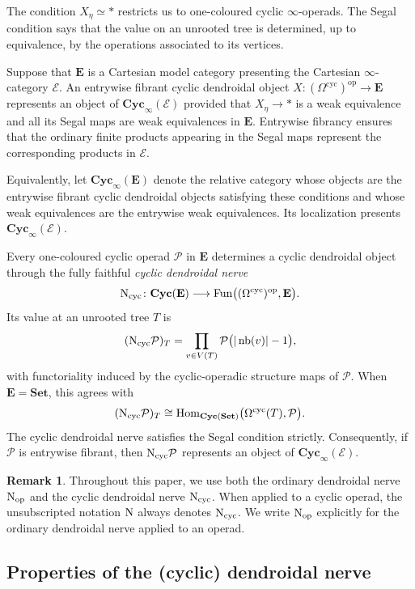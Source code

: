 \documentclass{amsart}
\newcommand{\bE}{\mathbf{E}}
\newcommand{\Set}{\mathbf{Set}}
\newcommand{\Cyc}{\mathbf{Cyc}}
\newcommand{\Hom}{\operatorname{Hom}}
\newcommand{\nerve}{\textnormal{N}}
\theoremstyle{definition}
\newtheorem{remark}[theorem]{Remark}%
\numberwithin{equation}{section}
\begin{document}
The condition $X_\eta\simeq *$ restricts us to one-coloured cyclic
$\infty$-operads. The Segal condition says that the value on an
unrooted tree is determined, up to equivalence, by the operations
associated to its vertices.

Suppose that $\bE$ is a Cartesian model category presenting the
Cartesian $\infty$-category $\mathcal E$. An entrywise fibrant cyclic
dendroidal object
$X\colon(\Omega^{\mathrm{cyc}})^{\mathrm{op}}\to\bE$
represents an object of $\Cyc_\infty(\mathcal E)$ provided that
$X_\eta\to *$ is a weak equivalence and all its Segal maps are weak
equivalences in $\bE$. Entrywise fibrancy ensures that the ordinary finite products
appearing in the Segal maps represent the corresponding products in
$\mathcal E$.

Equivalently, let $\Cyc_\infty(\bE)$ denote the relative category
whose objects are the entrywise fibrant cyclic dendroidal objects
satisfying these conditions and whose weak equivalences are the
entrywise weak equivalences. Its localization presents
$\Cyc_\infty(\mathcal E)$.

Every one-coloured cyclic operad $\mathcal P$ in $\bE$ determines a
cyclic dendroidal object through the fully faithful
\emph{cyclic dendroidal nerve}
\[
\nerve_{\mathrm{cyc}}\colon
\Cyc(\bE)
\longrightarrow
\operatorname{Fun}
\bigl((\Omega^{\mathrm{cyc}})^{\mathrm{op}},\bE\bigr).
\]
Its value at an unrooted tree $T$ is
\[
(\nerve_{\mathrm{cyc}}\mathcal P)_T
=
\prod_{v\in V(T)}
\mathcal P\bigl(|\operatorname{nb}(v)|-1\bigr),
\]
with functoriality induced by the cyclic-operadic structure maps of
$\mathcal P$. When $\bE=\Set$, this agrees with
\[
(\nerve_{\mathrm{cyc}}\mathcal P)_T
\cong
\Hom_{\Cyc(\Set)}
\bigl(\Omega^{\mathrm{cyc}}(T),\mathcal P\bigr).
\]
The cyclic dendroidal nerve satisfies the Segal condition strictly.
Consequently, if $\mathcal P$ is entrywise fibrant, then
$\nerve_{\mathrm{cyc}}\mathcal P$ represents an object of
$\Cyc_\infty(\mathcal E)$.

\begin{remark}
Throughout this paper, we use both the ordinary dendroidal nerve
$\nerve_{\mathrm{op}}$ and the cyclic dendroidal nerve
$\nerve_{\mathrm{cyc}}$. When applied to a cyclic operad, the
unsubscripted notation $\nerve$ always denotes
$\nerve_{\mathrm{cyc}}$. We write $\nerve_{\mathrm{op}}$ explicitly
for the ordinary dendroidal nerve applied to an operad.
\end{remark}


\subsection{Properties of the (cyclic) dendroidal nerve}
\label{subsec: properties of the (cyclic) dendroidal nerve}
\end{document}
